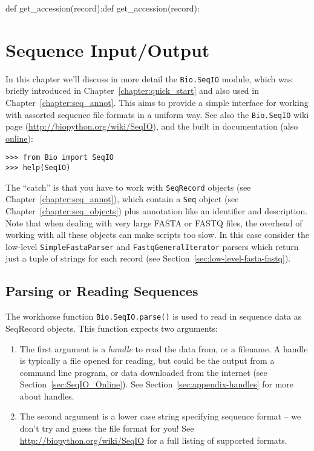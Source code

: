 def get_accession(record):def get_accession(record):\chapter{Sequence Input/Output}
\label{chapter:seqio}

In this chapter we'll discuss in more detail the \verb|Bio.SeqIO| module, which was briefly introduced in Chapter~\ref{chapter:quick_start} and also used in Chapter~\ref{chapter:seq_annot}. This aims to provide a simple interface for working with assorted sequence file formats in a uniform way.
See also the \verb|Bio.SeqIO| wiki page (\url{http://biopython.org/wiki/SeqIO}), and the built in documentation (also \href{http://biopython.org/docs/\bpversion/api/Bio.SeqIO.html}{online}):

\begin{verbatim}
>>> from Bio import SeqIO
>>> help(SeqIO)
\end{verbatim}

The ``catch'' is that you have to work with \verb|SeqRecord| objects (see Chapter~\ref{chapter:seq_annot}), which contain a \verb|Seq| object (see Chapter~\ref{chapter:seq_objects}) plus annotation like an identifier and description.
Note that when dealing with very large FASTA or FASTQ files, the overhead of working with all these objects can make scripts too slow.
In this case consider the low-level \verb|SimpleFastaParser| and \verb|FastqGeneralIterator| parsers which return just a tuple of strings for each record (see Section~\ref{sec:low-level-fasta-fastq}).

\section{Parsing or Reading Sequences}
\label{sec:Bio.SeqIO-input}

The workhorse function \verb|Bio.SeqIO.parse()| is used to read in sequence data as SeqRecord objects.  This function expects two arguments:

\begin{enumerate}
\item The first argument is a \textit{handle} to read the data from, or a filename. A handle is typically a file opened for reading, but could be the output from a command line program, or data downloaded from the internet (see Section~\ref{sec:SeqIO_Online}).  See Section~\ref{sec:appendix-handles} for more about handles.
\item The second argument is a lower case string specifying sequence format -- we don't try and guess the file format for you!  See \url{http://biopython.org/wiki/SeqIO} for a full listing of supported formats.
\end{enumerate}

